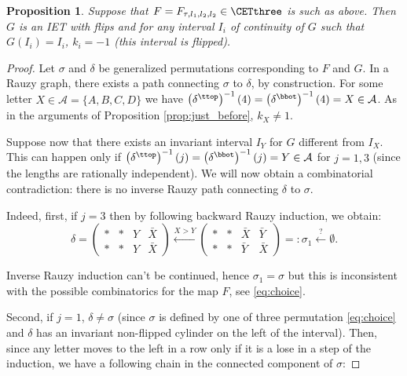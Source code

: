 \documentclass[12pt]{article}
\newtheorem{proposition}{Proposition}
\theoremstyle{definition}
\begin{document}
\begin{proposition}\label{prop:integrable_3}
Suppose that $F=F_{\tau, l_1, l_2, l_2}  \in \CETthree$ is such as above. Then $G$ is an IET with flips and for any interval $I_i$ of continuity of $G$ such that $G(I_i)=I_i$, $k_i=-1$ (this interval is flipped).
\end{proposition}

\begin{proof}
Let $\sigma$ and $\delta$ be generalized permutations corresponding to $F$ and $G$. In a Rauzy graph, there exists a path connecting $\sigma$ to $\delta$, by construction.
For some letter $X \in \mathcal{A}=\{A,B,C,D\}$ we have $\left({\delta}^{\ttop}\right)^{-1}(4)=\left({\delta}^{\bbot}\right)^{-1}(4)=X \in \mathcal{A}$. As in the arguments of Proposition \ref{prop:just_before}, $k_X \neq 1$.

Suppose now that there exists an invariant interval $I_Y$ for $G$ different from $I_X$. This can happen only if  $\left(\delta^{\ttop}\right)^{-1}(j)=\left(\delta^{\bbot}\right)^{-1}(j)=Y \in \mathcal{A}$ for $j=1,3$ (since the lengths are rationally independent). We will now obtain a combinatorial contradiction: there is no inverse Rauzy path connecting $\delta$ to $\sigma$. 

Indeed, first, if $j=3$ then by following backward Rauzy induction, we obtain:
\begin{equation*}
\delta=\begin{pmatrix}
\ast&\ast&Y&\bar{X}\\
\ast&\ast&Y&\bar{X}
\end{pmatrix}\xleftarrow[]{X>Y}
\begin{pmatrix}
\ast&\ast&\bar{X}&\bar{Y}\\
\ast&\ast&\bar{Y}&\bar{X}
\end{pmatrix}=: \sigma_1 \xleftarrow[]{?} \emptyset.
\end{equation*} 

Inverse Rauzy induction can't be continued, hence $\sigma_1=\sigma$ but this is inconsistent with the possible combinatorics for the map $F$, see \eqref{eq:choice}. 

Second, if $j=1$, $\delta \neq \sigma$ (since $\sigma$ is defined by one of three permutation \eqref{eq:choice} and $\delta$ has an invariant non-flipped cylinder on the left of the interval). Then, since any letter moves to the left in a row only if it is a lose in a step of the induction, we have a following chain in the connected component of $\sigma$:


\end{proof}
\end{document}
